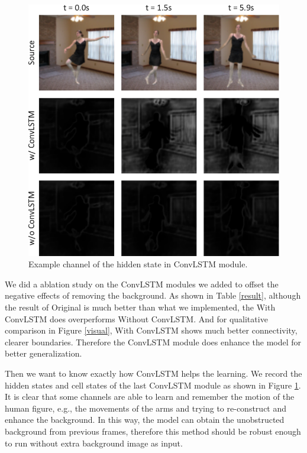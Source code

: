 \documentclass[final]{cvpr}
\begin{document}
\begin{figure}[htb]
    \begin{center}
        \includegraphics[width=1\linewidth]{img/ablationStudy.pdf}
    \end{center}
    \caption{Example channel of the hidden state in ConvLSTM module.}
    \label{ablationStudy}
\end{figure}

We did a ablation study on the ConvLSTM modules we added to offset the negative effects of removing the background.
As shown in Table \ref{result}, although the result of Original is much better than what we implemented, the With ConvLSTM does overperforms Without ConvLSTM.
And for qualitative comparison in Figure \ref{visual}, With ConvLSTM shows much better connectivity, clearer boundaries.
Therefore the ConvLSTM module does enhance the model for better generalization.

Then we want to know exactly how ConvLSTM helps the learning.
We record the hidden states and cell states of the last ConvLSTM module as shown in Figure \ref{ablationStudy}.
It is clear that some channels are able to learn and remember the motion of the human figure, e.g., the movements of the arms and trying to re-construct and enhance the background.
In this way, the model can obtain the unobstructed background from previous frames, therefore this method should be robust enough to run without extra background image as input.
\end{document}
